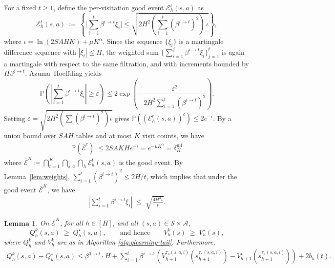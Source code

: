 \documentclass[11pt]{article}
\newcommand{\PP}{\mathbb{P}}
\newcommand{\lr}{\beta}
\newcommand{\eps}{\varepsilon}
\newtheorem{lemma}{Lemma}
\begin{document}
For a fixed $t \geq 1$, define the per-visitation good event $\mathcal{E}^t_h(s,a)$ as 
\[
\mathcal{E}^{t}_h(s,a) \;\coloneqq\; \left\{
\Big|\sum_{i=1}^t \lr^{i\rightarrow t} \xi_i\Big|
\le
\sqrt{2H^2\left(\sum_{i=1}^t(\lr^{i\rightarrow t})^2\right)\,\iota}
\right\},
\]
where $\iota=\ln(2SAHK)+\mu K^\alpha$. Since the sequence $\{\xi_i\}$ is a martingale difference sequence with $|\xi_i|\le H$, the weighted sum $\{ \sum_{i=1}^j \lr^{i\rightarrow t} \xi_i\}_{j=1}^t$ is again a martingale with respect to the same filtration, and with increments bounded by $H\lr^{j\rightarrow t}$. Azuma--Hoeffding yields
\[
\PP\!\left(\left|\sum_{i=1}^t \lr^{i\rightarrow t} \xi_i\right|\ge \eps\right)
\le 2\exp\!\left(-\frac{\eps^2}{2H^2\sum_{i=1}^t(\lr^{i\rightarrow t})^2}\right).
\]
Setting $\eps=\sqrt{2H^2(\sum(\lr^{i\rightarrow t})^2)\iota}$ gives $\PP((\mathcal{E}^t_h(s,a))^c)\le 2 e^{-\iota}$. By a union bound over $SAH$ tables and at most $K$ visit counts, we have 
\begin{align*}
    \PP(\bar{\mathcal{E}}^c)\;\le 2SAKH e^{-\iota} = e^{-\mu K^\alpha} = \delta_K^{\mathrm{mf}}
\end{align*}
where $\bar{\mathcal{E}}^K \coloneqq \bigcap_{t=1}^{K} \bigcap_{s,a}\bigcap_h \mathcal{E}^t_h(s,a)$ is the good event. By Lemma~\ref{lem:weights}, $\sum_{i=1}^t(\lr^{i\rightarrow t})^2\le 2H/t$, which implies that under the good event $\bar{\mathcal{E}}^K$, we have 
\begin{align}    \label{eq:eta_sum_bound}
\left|\sum_{i=1}^t \lr^{i\rightarrow t} \xi_i\right|
\;\le\;
\sqrt{\frac{4H^3\iota}{t}}.
\end{align}



\begin{lemma}
\label{lem:optimism}
On $\bar{\mathcal{E}}^K$, for all $h\in[H]$, and all $(s,a)\in\mathcal{S}\times\mathcal{A}$,
\[
Q_h^k(s,a)\;\ge\;Q_h^\star(s,a),
\qquad\text{and hence}\qquad
V_h^k(s)\;\ge\;V_h^\star(s),
\]
where $Q_h^k$ and $V_h^k$ are as in Algorithm \ref{alg:qlearning-tail}. Furthermore,
\begin{align*}
    Q_h^k(s,a) - Q_h^\star(s,a) \leq \lr^{0\rightarrow t}\cdot H + \sum_{i=1}^t \lr^{i\rightarrow t} \, \left(V_{h+1}^{\tau_h(s,a,i)}(s_{h+1}^{\tau_h(s,a,i)})-V_{h+1}^\star(s_{h+1}^{\tau_h(s,a,i)})\right) + 2 b_h(t).
\end{align*}
\end{lemma}
\end{document}
